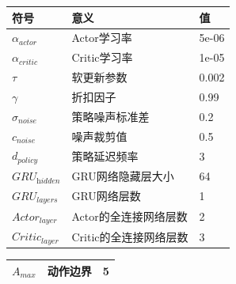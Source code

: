 \documentclass{scrbook}
\begin{document}
{{\par}
\begin{table}
\begin{tabularx}{\textwidth}{|p{}|p{}|p{}|} \hline 
\raggedright\arraybackslash{}符号 & \raggedright\arraybackslash{}意义 & \raggedright\arraybackslash{}值\\\hline 
$\alpha _{\textit{actor}}$ & \raggedright\arraybackslash{}Actor学习率 & \raggedright\arraybackslash{}5e-06\\\hline 
$\alpha _{\textit{critic}}$ & \raggedright\arraybackslash{}Critic学习率 & \raggedright\arraybackslash{}1e-05\\\hline 
$\tau $ & \raggedright\arraybackslash{}软更新参数 & \raggedright\arraybackslash{}0.002\\\hline 
$\gamma $ & \raggedright\arraybackslash{}折扣因子 & \raggedright\arraybackslash{}0.99\\\hline 
$\sigma _{\textit{noise}}$ & \raggedright\arraybackslash{}策略噪声标准差 & \raggedright\arraybackslash{}0.2\\\hline 
$c_{\textit{noise}}$ & \raggedright\arraybackslash{}噪声裁剪值 & \raggedright\arraybackslash{}0.5\\\hline 
$d_{\textit{policy}}$ & \raggedright\arraybackslash{}策略延迟频率 & \raggedright\arraybackslash{}3\\\hline 
$GRU_{\textit{hidden}}$ & \raggedright\arraybackslash{}GRU网络隐藏层大小 & \raggedright\arraybackslash{}64\\\hline 
$GRU_{\textit{layers}}$ & \raggedright\arraybackslash{}GRU网络层数 & \raggedright\arraybackslash{}1\\\hline 
$Actor_{\textit{layer}}$ & \raggedright\arraybackslash{}Actor的全连接网络层数 & \raggedright\arraybackslash{}2\\\hline 
$\textit{Criti}c_{\textit{layer}}$ & \raggedright\arraybackslash{}Critic的全连接网络层数 & \raggedright\arraybackslash{}3\\\hline 
\end{tabularx}
\begin{tabularx}{\textwidth}{|p{}|p{}|p{}|} \hline 
$A_{max}$ & \raggedright\arraybackslash{}动作边界 & \raggedright\arraybackslash{}5\\\hline 

\end{tabularx}
\end{table}}
\end{document}
